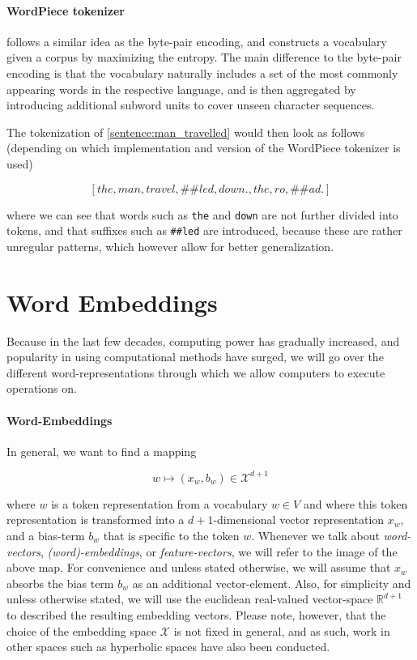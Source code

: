 \documentclass[a4paper,12pt,twoside,openright]{report}
\begin{document}
\paragraph{WordPiece tokenizer} \cite{wu16} follows a similar idea as the byte-pair encoding, and constructs a vocabulary given a corpus by maximizing the entropy.
The main difference to the byte-pair encoding is that the vocabulary naturally includes a set of the most commonly appearing words in the respective language, and is then aggregated by introducing additional subword units to cover unseen character sequences.

The tokenization of \eqref{sentence:man_travelled} would then look as follows (depending on which implementation and version of the WordPiece tokenizer is used)

$$
[the, man, travel, \#\#led, down., the, ro,  \#\#ad.]
$$

where we can see that words such as \Verb#the# and \Verb#down# are not further divided into tokens, and that suffixes such as \Verb!##led! are introduced, because these are rather unregular patterns, which however allow for better generalization.






\section{Word Embeddings}

Because in the last few decades, computing power has gradually increased, and popularity in using computational methods have surged, we will go over the different word-representations through which we allow computers to execute operations on.

\paragraph{Word-Embeddings}
In general, we want to find a mapping 

\begin{equation}
w \mapsto (x_w, b_w) \in \mathcal{X}^{d + 1}
\end{equation}{\label{map:embedding_mapping}}

where $w$ is a token representation from a vocabulary $w \in V$ and where this token representation is transformed into a $d+1$-dimensional vector representation $x_w$, and a bias-term $b_w$ that is specific to the token $w$.
Whenever we talk about \textit{word-vectors}, \textit{(word)-embeddings}, or \textit{feature-vectors}, we will refer to the image of the above map. 
For convenience and unless stated otherwise, we will assume that $x_w$ absorbs the bias term $b_w$ as an additional vector-element.
Also, for simplicity and unless otherwise stated, we will use the euclidean real-valued vector-space $\mathbb{R}^{d+1}$ to described the resulting embedding vectors.
Please note, however, that the choice of the embedding space $\mathcal{X}$ is not fixed in general, and as such, work in other spaces such as hyperbolic spaces  \cite{ganea18} have also been conducted. 
\end{document}
